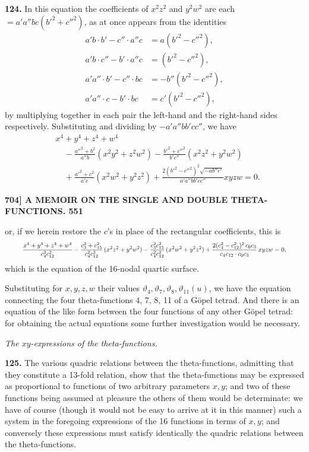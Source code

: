 \documentclass[11pt]{article}
\begin{document}
\medskip
\textbf{124.} In this equation the coefficients of $x^2z^2$ and $y^2w^2$ are each $= a'a''bc(b'^2 + c''^2)$, as at once appears from the identities
\[
\begin{aligned}
a'b\cdot b' - c''\cdot a''c &= a(b'^2 - c''^2),\\
a'b\cdot c'' - b'\cdot a''c &= (b'^2 - c''^2),\\
a'a''\cdot b' - c''\cdot bc &= -b''(b'^2 - c''^2),\\
a'a''\cdot c - b'\cdot bc &= c'(b'^2 - c''^2),
\end{aligned}
\]
by multiplying together in each pair the left-hand and the right-hand sides respectively. Substituting and dividing by $-a'a''bb'cc''$, we have
\[
\begin{aligned}
&x^4+y^4+z^4+w^4\\
&\quad-\frac{a''^2+b^2}{a''b}(x^2y^2+z^2w^2)
      -\frac{b'^2+c''^2}{b'c''}(x^2z^2+y^2w^2)\\
&\quad+\frac{a'^2+c^2}{a'c}(x^2w^2+y^2z^2)
      +\frac{2(b'^2-c''^2)^2\sqrt{-ab''c'}}{a'a''bb'cc''}xyzw=0.
\end{aligned}
\]

\newpage
\noindent\textbf{704] \quad A MEMOIR ON THE SINGLE AND DOUBLE THETA-FUNCTIONS. \hfill 551}

\medskip
or, if we herein restore the $c$'s in place of the rectangular coefficients, this is
\[
\resizebox{0.92\textwidth}{!}{$\displaystyle
\frac{x^4 + y^4 + z^4 + w^4}{c_4^2 c_{12}^2}
- \frac{c_3^2 + c_{15}^2}{c_4^2 c_{12}^2}\,(x^2z^2 + y^2w^2)
- \frac{c_3^2 c_{15}^2}{c_4^2 c_{12}^2}\,(x^2w^2 + y^2z^2)
+ \frac{2(c_4^2 - c_{12}^2)^2\,c_0 c_3}{c_4 c_{12}\cdot c_0 c_3}\,xyzw = 0,
$}
\]
which is the equation of the 16-nodal quartic surface.

\medskip
Substituting for $x, y, z, w$ their values $\vartheta_4, \vartheta_7, \vartheta_8, \vartheta_{11}(u)$, we have the equation connecting the four theta-functions 4, 7, 8, 11 of a G\"opel tetrad. And there is an equation of the like form between the four functions of any other G\"opel tetrad: for obtaining the actual equations some further investigation would be necessary.

\medskip
\begin{center}\textit{The $xy$-expressions of the theta-functions.}\end{center}

\medskip
\textbf{125.} The various quadric relations between the theta-functions, admitting that they constitute a 13-fold relation, show that the theta-functions may be expressed as proportional to functions of two arbitrary parameters $x, y$; and two of these functions being assumed at pleasure the others of them would be determinate: we have of course (though it would not be easy to arrive at it in this manner) such a system in the foregoing expressions of the 16 functions in terms of $x, y$; and conversely these expressions must satisfy identically the quadric relations between the theta-functions.
\end{document}
